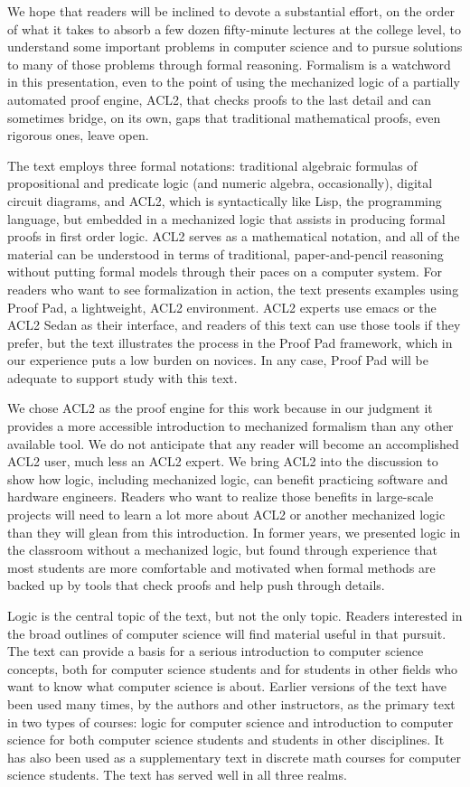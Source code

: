 We hope that readers will be inclined
to devote a substantial effort, on the order
of what it takes to absorb a few dozen fifty-minute
lectures at the college level,
to understand some important problems in computer science and
to pursue solutions to many of those problems through formal reasoning.
Formalism is a watchword in this presentation, even to the
point of using the mechanized logic of a partially automated proof engine,
ACL2, that checks proofs to the last detail and can sometimes
bridge, on its own, gaps that traditional mathematical
proofs, even rigorous ones, leave open.

The text employs three formal notations:
traditional algebraic formulas of propositional and predicate logic
(and numeric algebra, occasionally),
digital circuit diagrams, and ACL2, which is syntactically
like Lisp, the programming language, but embedded
in a mechanized logic that assists in producing
formal proofs in first order logic.
ACL2 serves as a mathematical notation, and all
of the material can be understood in terms of
traditional, paper-and-pencil reasoning
without putting formal models
through their paces on a computer system.
For readers who want to see formalization
in action, the text presents examples using
Proof Pad, a lightweight, ACL2 environment.
ACL2 experts use emacs or the ACL2 Sedan
as their interface, and readers of this text can
use those tools if they prefer, but the text
illustrates the process in the Proof Pad framework,
which in our experience puts a low burden on novices.
In any case, Proof Pad will be adequate to support
study with this text.

We chose ACL2 as the proof engine for this work
because in our judgment it provides a more accessible
introduction to mechanized formalism than any other
available tool. We do not anticipate that any
reader will become an accomplished ACL2 user,
much less an ACL2 expert. We bring ACL2 into the discussion
to show how logic, including mechanized logic,
can benefit practicing software and hardware engineers.
Readers who want to realize those benefits in
large-scale projects will need to learn a lot more
about ACL2 or another mechanized logic than they
will glean from this introduction.
In former years, we presented logic in the classroom
without a mechanized logic, but found through experience
that most students are more comfortable and motivated
when formal methods are backed up by tools
that check proofs and help
push through details.

Logic is the central topic of the text, but not the only topic.
Readers interested in the broad outlines of computer science
will find material useful in that pursuit.
The text can provide a basis for a serious introduction
to computer science concepts, both for computer science students
and for students in other fields who want to know
what computer science is about.
Earlier versions of the text have been used many times,
by the authors and other instructors,
as the primary text in two types of courses: logic for computer science
and introduction to computer science for both computer science students
and students in other disciplines.
It has also been used as a supplementary
text in discrete math courses for computer science students.
The text has served well in all three realms.

